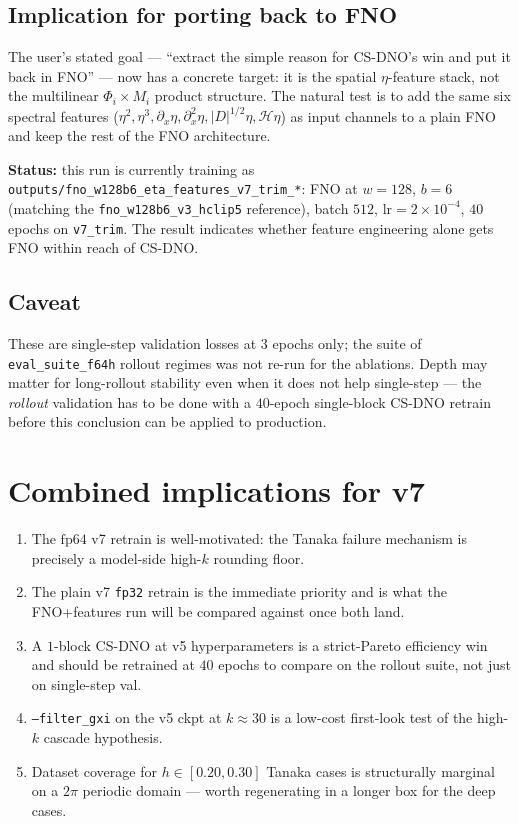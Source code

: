 \documentclass[11pt,letterpaper]{article}
\newcommand{\Hop}{\mathcal{H}}
\begin{document}
\subsection{Implication for porting back to FNO}

The user's stated goal --- ``extract the simple reason for CS-DNO's win and put it back in
FNO'' --- now has a concrete target: it is the spatial $\eta$-feature stack, not the
multilinear $\Phi_{i}\!\times\!M_{i}$ product structure. The natural test is to add the
same six spectral features ($\eta^{2},\eta^{3},\partial_{x}\eta,\partial_{x}^{2}\eta,|D|^{1/2}\eta,\Hop\eta$)
as input channels to a plain FNO and keep the rest of the FNO architecture.

\textbf{Status:} this run is currently training as
\texttt{outputs/fno\_w128b6\_eta\_features\_v7\_trim\_*}: FNO at $w=128$, $b=6$ (matching the
\texttt{fno\_w128b6\_v3\_hclip5} reference), batch $512$, $\mathrm{lr}=2\!\times\!10^{-4}$,
$40$ epochs on \texttt{v7\_trim}. The result indicates whether feature engineering alone
gets FNO within reach of CS-DNO.

\subsection{Caveat}

These are single-step validation losses at $3$ epochs only; the suite of
\texttt{eval\_suite\_f64h} rollout regimes was not re-run for the ablations. Depth may
matter for long-rollout stability even when it does not help single-step --- the
\emph{rollout} validation has to be done with a $40$-epoch single-block CS-DNO retrain
before this conclusion can be applied to production.

\section{Combined implications for v7}

\begin{enumerate}[leftmargin=1.4em,topsep=0pt,itemsep=4pt]
  \item The $\mathrm{fp64}$ v7 retrain is well-motivated: the Tanaka failure mechanism is
        precisely a model-side high-$k$ rounding floor.
  \item The plain v7 \texttt{fp32} retrain is the immediate priority and is what the
        FNO+features run will be compared against once both land.
  \item A $1$-block CS-DNO at v5 hyperparameters is a strict-Pareto efficiency win and
        should be retrained at $40$ epochs to compare on the rollout suite, not just on
        single-step val.
  \item \texttt{--filter\_gxi} on the v5 ckpt at $k\!\approx\!30$ is a low-cost
        first-look test of the high-$k$ cascade hypothesis.
  \item Dataset coverage for $h\!\in\![0.20, 0.30]$ Tanaka cases is structurally marginal
        on a $2\pi$ periodic domain --- worth regenerating in a longer box for the deep
        cases.
\end{enumerate}
\end{document}
